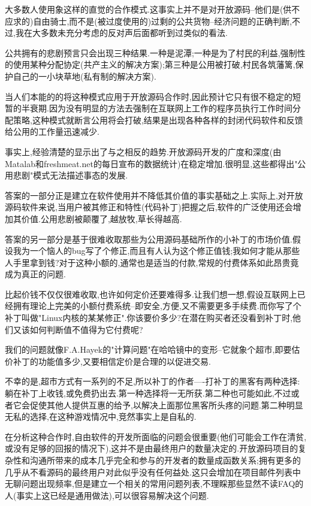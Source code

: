 \documentclass[a4paper,12pt,UTF8,twoside]{ctexbook}
\begin{document}
大多数人使用象这样的直觉的合作模式.这事实上并不是对开放源码--他们是(供不应求的)自由骑士,而不是(被过度使用的)过剩的公共货物--经济问题的正确判断,不过,我在大多数未充分考虑的反对声后面都听到过类似的看法.


公共拥有的悲剧预言只会出现三种结果.一种是泥潭;一种是为了村民的利益,强制性的使用某种分配协定(共产主义的解决方案);第三种是公用被打破,村民各筑藩篱,保护自己的一小块草地(私有制的解决方案).


当人们本能的的将这种模式应用于开放源码合作时,因此预计它只有很不稳定的短暂的半衰期.因为没有明显的方法去强制在互联网上工作的程序员执行工作时间分配策略,这种模式就断言公用将会打破,结果是出现各种各样的封闭代码软件和反馈给公用的工作量迅速减少.


事实上,经验清楚的显示出了与之相反的趋势.开放源码开发的广度和深度(由Matalab和freshmeat.net的每日宣布的数据统计)在稳定增加.很明显,这些都得出"公用悲剧"模式无法描述事态的发展.


答案的一部分正是建立在软件使用并不降低其价值的事实基础之上.实际上,对开放源码软件来说,当用户被其修正和特性(代码补丁)把握之后,软件的广泛使用还会增加其价值.公用悲剧被颠覆了,越放牧,草长得越高.


答案的另一部分是基于很难收取那些为公用源码基础所作的小补丁的市场价值.假设我为一个恼人的bug写了个修正,而且有人认为这个修正值钱;我如何才能从那些人手里拿到钱?对于这种小额的,通常也是适当的付款,常规的付费体系如此昂贵竟成为真正的问题.


比起价钱不仅仅很难收取,也许如何定价还要难得多.让我们想一想,假设互联网上已经拥有理论上完美的小额付费系统--即安全,方便,又不需要更多手续费.而你写了个补丁叫做"Linux内核的某某修正".你该要价多少?在潜在购买者还没看到补丁时,他们又该如何判断值不值得为它付费呢?


我们的问题就像F.A.Hayek的"计算问题"在哈哈镜中的变形--它就象个超市,即要估价补丁的功能值多少,又要相信定价是合理的以促进交易.


不幸的是,超市方式有一系列的不足,所以补丁的作者----打补丁的黑客有两种选择:躺在补丁上收钱,或免费扔出去.第一种选择将一无所获.第二种也可能如此,不过或者它会促使其他人提供互惠的给予,以解决上面那位黑客所头疼的问题.第二种明显无私的选择,在这种游戏情况中,竞然事实上是自私的.


在分析这种合作时,自由软件的开发所面临的问题会很重要(他们可能会工作在清贫,或没有足够的回报的情况下),这并不是由最终用户的数量决定的.开放源码项目的复杂性和沟通所带来的成本几乎完全和参与的开发者的数量成函数关系;拥有更多的几乎从不看源码的最终用户对此似乎没有任何益处.这只会增加在项目邮件列表中无聊问题出现频率,但是建立一个相关的常用问题列表,不理睬那些显然不读FAQ的人(事实上这已经是通用做法),可以很容易解决这个问题.
\end{document}
